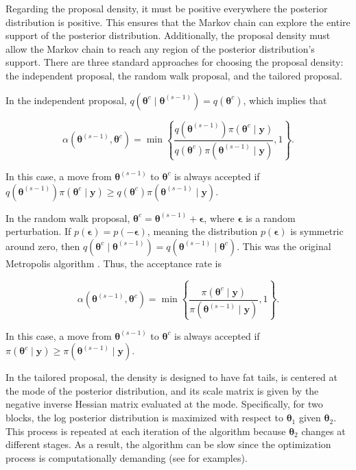 Regarding the proposal density, it must be positive everywhere the posterior distribution is positive. This ensures that the Markov chain can explore the entire support of the posterior distribution. Additionally, the proposal density must allow the Markov chain to reach any region of the posterior distribution's support. There are three standard approaches for choosing the proposal density: the independent proposal, the random walk proposal, and the tailored proposal.

In the independent proposal, $q(\bm{\theta}^{c} \mid  \bm{\theta}^{(s-1)}) = q(\bm{\theta}^{c})$, which implies that 

\[
\alpha(\bm{\theta}^{(s-1)}, \bm{\theta}^{c}) = 
\min\left\{\frac{q(\bm{\theta}^{(s-1)}) \pi(\bm{\theta}^{c} \mid  \bm{y})}{q(\bm{\theta}^{c}) \pi(\bm{\theta}^{(s-1)} \mid  \bm{y})}, 1\right\}.
\]

In this case, a move from $\bm{\theta}^{(s-1)}$ to $\bm{\theta}^{c}$ is always accepted if $q(\bm{\theta}^{(s-1)}) \pi(\bm{\theta}^{c} \mid  \bm{y}) \geq q(\bm{\theta}^{c}) \pi(\bm{\theta}^{(s-1)} \mid  \bm{y})$.

In the random walk proposal, $\bm{\theta}^{c} = \bm{\theta}^{(s-1)} + \bm{\epsilon}$, where $\bm{\epsilon}$ is a random perturbation. If $p(\bm{\epsilon}) = p(-\bm{\epsilon})$, meaning the distribution $p(\bm{\epsilon})$ is symmetric around zero, then $q(\bm{\theta}^{c} \mid  \bm{\theta}^{(s-1)}) = q(\bm{\theta}^{(s-1)} \mid  \bm{\theta}^{c})$. This was the original Metropolis algorithm \cite{metropolis53}. Thus, the acceptance rate is 

\[
\alpha(\bm{\theta}^{(s-1)}, \bm{\theta}^{c}) = 
\min\left\{\frac{\pi(\bm{\theta}^{c} \mid  \bm{y})}{\pi(\bm{\theta}^{(s-1)} \mid  \bm{y})}, 1\right\}.
\]

In this case, a move from $\bm{\theta}^{(s-1)}$ to $\bm{\theta}^{c}$ is always accepted if $\pi(\bm{\theta}^{c} \mid  \bm{y}) \geq \pi(\bm{\theta}^{(s-1)} \mid  \bm{y})$.

In the tailored proposal, the density is designed to have fat tails, is centered at the mode of the posterior distribution, and its scale matrix is given by the negative inverse Hessian matrix evaluated at the mode. Specifically, for two blocks, the log posterior distribution is maximized with respect to $\bm{\theta}_1$ given $\bm{\theta}_2$. This process is repeated at each iteration of the algorithm because $\bm{\theta}_2$ changes at different stages. As a result, the algorithm can be slow since the optimization process is computationally demanding (see \cite[Chap.~7 and 9]{greenberg2012introduction} for examples).

